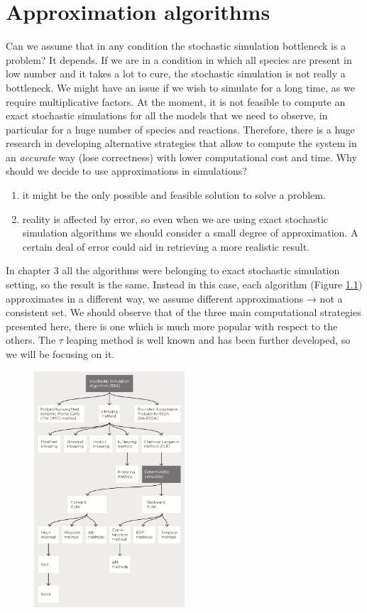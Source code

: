 \graphicspath{{chapters/04/images/}}
\chapter{Approximation algorithms}
Can we assume that in any condition the stochastic simulation bottleneck is a problem? It depends.
If we are in a condition in which all species are present in low number and it takes a lot to cure, the stochastic simulation is not really a bottleneck.
We might have an issue if we wish to simulate for a long time, as we require multiplicative factors.
At the moment, it is not feasible to compute an exact stochastic simulations for all the models that we need to observe, in particular for a huge number of species and reactions. Therefore, there is a huge research in developing alternative strategies that allow to compute the system in an \emph{accurate} way (lose correctness) with lower computational cost and time.
Why should we decide to use approximations in simulations?

\begin{enumerate}
  \def\labelenumi{\arabic{enumi}.}
  \item it might be the only possible and feasible solution to solve a problem.
  \item reality is affected by error, so even when we are using exact stochastic simulation algorithms we should consider a small degree of approximation.
    A certain deal of error could aid in retrieving a more realistic result.
\end{enumerate}
\noindent
In chapter 3 all the algorithms were belonging to exact stochastic simulation setting, so the result is the same.
Instead in this case, each algorithm (Figure \ref{fig:SSA_tree}) approximates in a different way,  we assume different approximations → not a consistent set.
We should observe that of the three main computational strategies presented here, there is one which is much more popular with respect to the others.
The $\tau$ leaping method is well known and has been further developed, so we will be focusing on it.

\begin{figure}
  \centering 
  \includegraphics[width=0.5\textwidth]{SSA_tree.png}
  \caption{}
    \label{fig:SSA_tree}
\end{figure}


